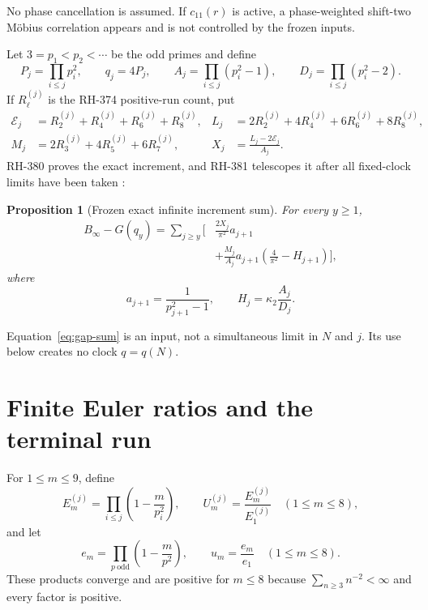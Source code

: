 \documentclass[11pt]{article}
\newtheorem{proposition}[theorem]{Proposition}
\theoremstyle{definition}
\theoremstyle{remark}
\newcommand{\Ecal}{\mathcal E}
\newcommand{\kap}{\kappa_2}
\begin{document}
No phase cancellation is assumed.  If $c_{11}(r)$ is active, a
phase-weighted shift-two M\"obius correlation appears and is not controlled
by the frozen inputs.

Let $3=p_1<p_2<\cdots$ be the odd primes and define
\begin{equation}
 P_j=\prod_{i\le j}p_i^2,\qquad q_j=4P_j,\qquad
 A_j=\prod_{i\le j}(p_i^2-1),\qquad
 D_j=\prod_{i\le j}(p_i^2-2).
 \label{eq:square-data}
\end{equation}
If $R_\ell^{(j)}$ is the RH-374 positive-run count, put
\begin{align}
 \Ecal_j&=R_2^{(j)}+R_4^{(j)}+R_6^{(j)}+R_8^{(j)},
 &L_j&=2R_2^{(j)}+4R_4^{(j)}+6R_6^{(j)}+8R_8^{(j)},
 \label{eq:EL}\\
 M_j&=2R_3^{(j)}+4R_5^{(j)}+6R_7^{(j)},
 &X_j&=\frac{L_j-2\Ecal_j}{A_j}.
 \label{eq:MX}
\end{align}
RH-380 proves the exact increment, and RH-381 telescopes it after all
fixed-clock limits have been taken \cite{RH380,RH381}:
\begin{proposition}[Frozen exact infinite increment sum]
For every $y\ge1$,
\begin{equation}
\begin{aligned}
B_\infty-G(q_y)=\sum_{j\ge y}\biggl[
 &\frac{2X_j}{\pi^2}a_{j+1}\\
 &+\frac{M_j}{A_j}a_{j+1}
 \left(\frac4{\pi^2}-H_{j+1}\right)\biggr],
\end{aligned}
\label{eq:gap-sum}
\end{equation}
where
\[
 a_{j+1}=\frac1{p_{j+1}^2-1},\qquad
 H_j=\kap\frac{A_j}{D_j}.
\]
\end{proposition}

Equation~\eqref{eq:gap-sum} is an input, not a simultaneous limit in $N$
and $j$.  Its use below creates no clock $q=q(N)$.

\section{Finite Euler ratios and the terminal run}

For $1\le m\le9$, define
\begin{equation}
 E_m^{(j)}=\prod_{i\le j}\left(1-\frac m{p_i^2}\right),
 \qquad
 U_m^{(j)}=\frac{E_m^{(j)}}{E_1^{(j)}}\quad(1\le m\le8),
 \label{eq:finite-euler}
\end{equation}
and let
\begin{equation}
 e_m=\prod_{p\ \mathrm{odd}}\left(1-\frac m{p^2}\right),
 \qquad u_m=\frac{e_m}{e_1}\quad(1\le m\le8).
 \label{eq:infinite-euler}
\end{equation}
These products converge and are positive for $m\le8$ because
$\sum_{n\ge3}n^{-2}<\infty$ and every factor is positive.
\end{document}
